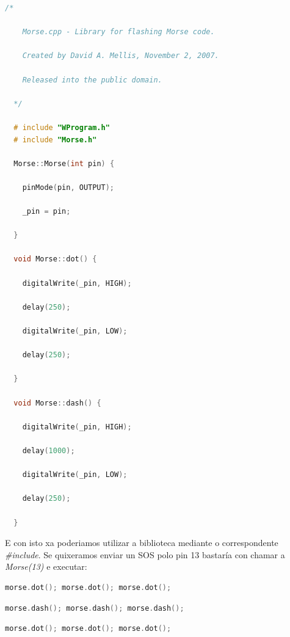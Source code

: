  \begin{lstlisting}[language=C++,frame=single]
  /*
 
    Morse.cpp - Library for flashing Morse code.
 
    Created by David A. Mellis, November 2, 2007.
 
    Released into the public domain.
 
  */

  # include "WProgram.h"
  # include "Morse.h"

  Morse::Morse(int pin) {
 
    pinMode(pin, OUTPUT);
 
    _pin = pin;

  }

  void Morse::dot() {
 
    digitalWrite(_pin, HIGH);
 
    delay(250);
 
    digitalWrite(_pin, LOW);
 
    delay(250);
 
  }

  void Morse::dash() {
 
    digitalWrite(_pin, HIGH);
 
    delay(1000);
 
    digitalWrite(_pin, LOW);
 
    delay(250);
 
  }
 \end{lstlisting}

 E con isto xa poderiamos utilizar a biblioteca mediante o correspondente
 \textit{\#include}. Se quixeramos enviar un SOS polo pin 13 bastaría con
 chamar a \textit{Morse(13)} e executar: \\

 \begin{lstlisting}[language=C++,frame=single]
  morse.dot(); morse.dot(); morse.dot();
 \end{lstlisting}

 \begin{lstlisting}[language=C++,frame=single]
  morse.dash(); morse.dash(); morse.dash();
 \end{lstlisting}

 \begin{lstlisting}[language=C++,frame=single]
  morse.dot(); morse.dot(); morse.dot();
 \end{lstlisting}
